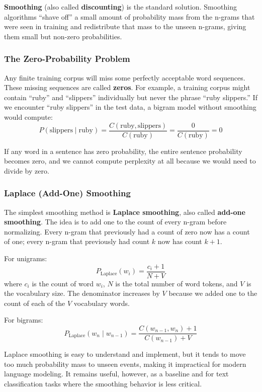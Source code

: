 \documentclass[11pt,a4paper]{article}
\begin{document}
\textbf{Smoothing} (also called \textbf{discounting}) is the standard solution. Smoothing algorithms ``shave off'' a small amount of probability mass from the n-grams that were seen in training and redistribute that mass to the unseen n-grams, giving them small but non-zero probabilities.

\subsubsection{The Zero-Probability Problem}

Any finite training corpus will miss some perfectly acceptable word sequences. These missing sequences are called \textbf{zeros}. For example, a training corpus might contain ``ruby'' and ``slippers'' individually but never the phrase ``ruby slippers.'' If we encounter ``ruby slippers'' in the test data, a bigram model without smoothing would compute:
\[
P(\text{slippers} \mid \text{ruby}) = \frac{C(\text{ruby}, \text{slippers})}{C(\text{ruby})} = \frac{0}{C(\text{ruby})} = 0
\]

If any word in a sentence has zero probability, the entire sentence probability becomes zero, and we cannot compute perplexity at all because we would need to divide by zero.

\subsubsection{Laplace (Add-One) Smoothing}

The simplest smoothing method is \textbf{Laplace smoothing}, also called \textbf{add-one smoothing}. The idea is to add one to the count of every n-gram before normalizing. Every n-gram that previously had a count of zero now has a count of one; every n-gram that previously had count $k$ now has count $k+1$.

For unigrams:
\[
P_{\text{Laplace}}(w_i) = \frac{c_i + 1}{N + V}
\]
where $c_i$ is the count of word $w_i$, $N$ is the total number of word tokens, and $V$ is the vocabulary size. The denominator increases by $V$ because we added one to the count of each of the $V$ vocabulary words.

For bigrams:
\[
P_{\text{Laplace}}(w_n \mid w_{n-1}) = \frac{C(w_{n-1}, w_n) + 1}{C(w_{n-1}) + V}
\]

Laplace smoothing is easy to understand and implement, but it tends to move too much probability mass to unseen events, making it impractical for modern language modeling. It remains useful, however, as a baseline and for text classification tasks where the smoothing behavior is less critical.
\end{document}
